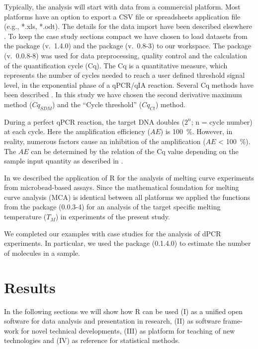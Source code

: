 Typically, the analysis will start with data from a commercial platform. Most 
platforms have an option to export a CSV file or spreadsheets application file 
(e.g., *.xls, *.odt). The details for the data import have been described 
elsewhere \citep{RDCT2010c, rodiger_rkward_2012}. To keep the case study 
sections compact we have chosen to load datasets from the  package 
\citep{ritz_2008, spiess_2008} (v.~1.4.0) and the  package 
(v.~0.8-3) to our workspace. The  package 
\citep{roediger_2015_Bioinformatics} (v.~0.0.8-8) was used for data 
preprocessing, quality control and  the calculation of the quantification cycle 
(Cq). The Cq is a quantitative measure, which represents the number of cycles 
needed to reach a user defined threshold signal level, in the exponential phase 
of a qPCR/qIA reaction. Several Cq methods have been described 
\citep{ruijter_2013}. In this study we have chosen the second derivative maximum 
method ($Cq_{SDM}$) and the ``Cycle threshold'' ($Cq_{Ct}$) method.

During a perfect qPCR reaction, the target DNA doubles ($2^{n}$; n = cycle 
number) at each cycle. Here the amplification efficiency ($AE$) is 100~\%. 
However, in reality, numerous factors cause an inhibition of the amplification 
($AE$ < 100~\%). The $AE$ can be determined by the relation of the Cq value 
depending on the sample input quantity as described in 
\citep{roediger_2015_Bioinformatics, svec_2015}.

In \citet{roediger_RJ_2013} we described the application of R for the analysis 
of melting curve experiments from microbead-based assays. Since the mathematical 
foundation for melting curve analysis (MCA) is identical between all platforms 
we applied the functions from the  package (0.0.3-4) for an 
analysis of the target specific melting temperature ($T_{M}$) in experiments of 
the present study.

We completed our examples with case studies for the analysis of dPCR 
experiments. In particular, we used the  package (0.1.4.0) to 
estimate the number of molecules in a sample.

\section{Results}

In the following sections we will show how R can be used (I) as a unified open 
software for data analysis and presentation in research, (II) as software 
frame-work for novel technical developments, (III) as platform for teaching of 
new technologies and (IV) as reference for statistical methods.

